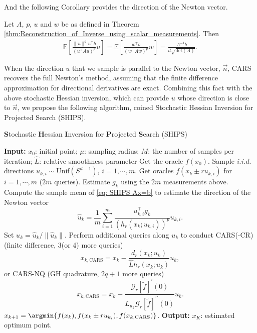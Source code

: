 And the following Corollary provides the direction of the Newton vector.
\begin{corollary}
    \label{Cor:RandInv Ax=b}
    Let $A$, $p$, $u$ and $w$ be as defined in Theorem \ref{thm:Reconstruction_of_Inverse_using_scalar_measurements}. Then
    \begin{align}
        \mathbb{E}\left[  \frac{\|u\|^{d} u^{\top}b}{(u^{\top}Au)^p}u \right]
        = \mathbb{E}\left[\frac{w^{\top}b}{(w^{\top}Aw)^p}w\right]
        = \frac{A^{-1}b}{d\sqrt{\mathrm{det}(A)}}. \label{eq: SHIPS Ax=b}
    \end{align}
\end{corollary}

When the direction $u$ that we sample is parallel to the Newton vector, $\vec{n}$, CARS recovers the full Newton's method, assuming that the finite difference approximation for directional derivatives are exact.
Combining this fact with the above stochastic Hessian inversion, which can provide $u$ whose direction is close to $\vec{n}$, we propose the following algorithm, coined Stochastic Hessian Inversion for Projected Search (SHIPS).

\begin{algorithm}[t]
    \caption{\textbf{S}tochastic \textbf{H}essian \textbf{I}nversion for \textbf{P}rojected \textbf{S}earch (SHIPS)}
    \label{alg:RandInv}
    \begin{algorithmic}[1]
        \State \textbf{Input:} $x_0$: initial point; $\mu$: sampling radius; $M$: the number of samples per iteration;  $\hat{L}$: relative smoothness parameter
        \State Get the oracle $f(x_0)$.
        \State Sample \emph{i.i.d.} directions $u_{k,i} \sim \textrm{Unif}(S^{d-1})$, $i=1,\cdots,m$.
        \State Get oracles $f(x_{k} \pm r u_{k,i})$ for $i=1,\cdots,m$ ($2m$ queries).
        \State \label{Alg: RandInv g_k estimation} Estimate $g_k$ using the $2m$ measurements above.
        \State \label{Alg: RandInv sample mean} Compute the sample mean of \eqref{eq: SHIPS Ax=b} to estimate the direction of the Newton vector
        \[
            \hat{u}_k = \frac{1}{m}\sum_{i=1}^{m} \frac{u_{k,i}^{\top}g_k}{(h_r(x_k;u_{k,i}))^p}u_{k,i}.
        \]
        \State  Set $u_k = \hat{u}_k / \|\hat{u}_k\|$.
        \State  Perform additional queries along $u_k$ to conduct CARS(-CR) (finite difference, 3(or 4) more queries)
        \[
            x_{k, \mathrm{CARS}} = x_k - \frac{d_r(x_k;u_k)}{\hat{L} h_r (x_k; u_k)}u_k,
        \]
        or CARS-NQ (GH quadrature, $2q+1$ more queries)
        \[
            x_{k, \mathrm{CARS}} = x_k - \frac{\mathcal{G}_{r}[\tilde{f}]^{\prime}(0)}{\hat{L}_{u_k} \mathcal{G}_{r}[\tilde{f}]^{\prime\prime}(0) } u_k.
        \]
        \State $x_{k+1} = \argmin\{f(x_k), f(x_{k} \pm r u_{k_i}), f(x_{k, \mathrm{CARS}}) \}$.
        \EndFor
        \State \textbf{Output:} $x_K$: estimated optimum point.
    \end{algorithmic}
\end{algorithm}

